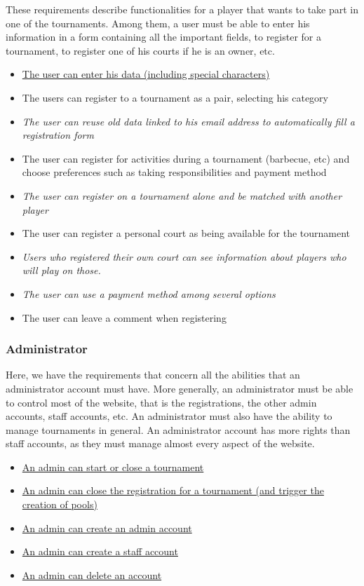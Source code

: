 \documentclass[a4paper, 12pt]{article}
\begin{document}
	These requirements describe functionalities for a player that wants to take part in one of the tournaments. Among them, a user must be able to enter his information in a form containing all the important fields, to register for a tournament, to register one of his courts if he is an owner, etc.\\
	
	\begin{itemize}
		\item \underline{The user can enter his data (including special characters) }
		\item The users can register to a tournament as a pair, selecting his category 
		\item \textit{The user can reuse old data linked to his email address to automatically fill a registration form}
		\item The user can register for activities during a tournament (barbecue, etc) and choose preferences such as taking responsibilities and payment method
		\item \textit{The user can register on a tournament alone and be matched with another player}
		\item The user can register a personal court as being available for the tournament
		\item \textit{Users who registered their own court can see information about players who will play on those.}
		\item \textit{The user can use a payment method among several options}
		\item The user can leave a comment when registering
	\end{itemize}

\subsubsection*{Administrator}
    Here, we have the requirements that concern all the abilities that an administrator account must have. More generally, an administrator must be able to control most of the website, that is the registrations, the other admin accounts, staff accounts, etc. An administrator must also have the ability to manage tournaments in general. An administrator account has more rights than staff accounts, as they must manage almost every aspect of the website.\\ 
    
    \begin{itemize}
    	\item \underline{An admin can start or close a tournament}
    	\item \underline{An admin can close the registration for a tournament (and trigger the creation of pools)}
    	\item \underline{An admin can create an admin account}
		\item \underline{An admin can create a staff account}
		\item \underline{An admin can delete an account}

    \end{itemize}
    
\end{document}
